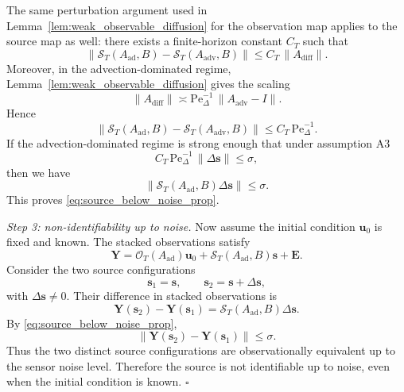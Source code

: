 The same perturbation argument used in Lemma~\ref{lem:weak_observable_diffusion} for the observation map applies to the source map as well: there exists a finite-horizon constant $C_T$ such that
\begin{equation}
\|\mathcal{S}_T(A_{\mathrm{ad}},B)-\mathcal{S}_T(A_{\mathrm{adv}},B)\|
\le
C_T \,\|A_{\mathrm{diff}}\|. \nonumber
\label{eq:source_map_perturb_bound}
\end{equation}
Moreover, in the advection-dominated regime, Lemma~\ref{lem:weak_observable_diffusion} gives the scaling
\begin{equation}
\|A_{\mathrm{diff}}\|
\asymp
\mathrm{Pe}_{\Delta}^{-1}\,\|A_{\mathrm{adv}}-I\|. \nonumber
\end{equation}
Hence
\begin{equation}
\|\mathcal{S}_T(A_{\mathrm{ad}},B)-\mathcal{S}_T(A_{\mathrm{adv}},B)\|
\le
C_T\,\mathrm{Pe}_{\Delta}^{-1}. \nonumber
\label{eq:source_map_pe_bound}
\end{equation}
If the advection-dominated regime is strong enough that under assumption A3
\begin{equation}
C_T\,\mathrm{Pe}_{\Delta}^{-1}\,\|\Delta \mathbf{s}\|
\le \sigma, \nonumber
\label{eq:source_noise_condition}
\end{equation}
then we have
\begin{equation}
\|\mathcal{S}_T(A_{\mathrm{ad}},B)\Delta \mathbf{s}\|
\le \sigma. \nonumber
\end{equation}
This proves \eqref{eq:source_below_noise_prop}.

\emph{Step 3: non-identifiability up to noise.}
Now assume the initial condition $\mathbf{u}_0$ is fixed and known. The stacked observations satisfy
\begin{equation}
\mathbf{Y} = \mathcal{O}_T(A_{\mathrm{ad}})\mathbf{u}_0 + \mathcal{S}_T(A_{\mathrm{ad}},B)\mathbf{s} + \mathbf{E}. \nonumber
\end{equation}
Consider the two source configurations
\begin{equation}
\mathbf{s}_1 = \mathbf{s},
\qquad
\mathbf{s}_2 = \mathbf{s}+\Delta \mathbf{s}, \nonumber
\end{equation}
with $\Delta \mathbf{s}\neq 0$. Their difference in stacked observations is
\begin{equation}
\mathbf{Y}(\mathbf{s}_2)-\mathbf{Y}(\mathbf{s}_1)
=
\mathcal{S}_T(A_{\mathrm{ad}},B)\Delta \mathbf{s}. \nonumber
\end{equation}
By \eqref{eq:source_below_noise_prop},
\begin{equation}
\|\mathbf{Y}(\mathbf{s}_2)-\mathbf{Y}(\mathbf{s}_1)\|
\le \sigma. \nonumber
\end{equation}
Thus the two distinct source configurations are observationally equivalent up to the sensor noise level. Therefore the source is not identifiable up to noise, even when the initial condition is known. \hfill $\square$


